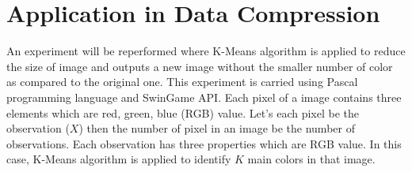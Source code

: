 \documentclass[conference]{IEEEtran}
\begin{document}
\section{Application in Data Compression}
\indent An experiment will be reperformed where K-Means algorithm is applied to reduce the size of image and outputs a new image without the smaller number of color as compared to the original one. This experiment is carried using Pascal programming language and SwinGame API.
\indent Each pixel of a image contains three elements which are red, green, blue (RGB) value. Let's each pixel be the observation ($X$) then the number of pixel in an image be the number of observations. Each observation has three properties which are RGB value. In this case, K-Means algorithm is applied to identify $K$ main colors in that image. \\
\end{document}
